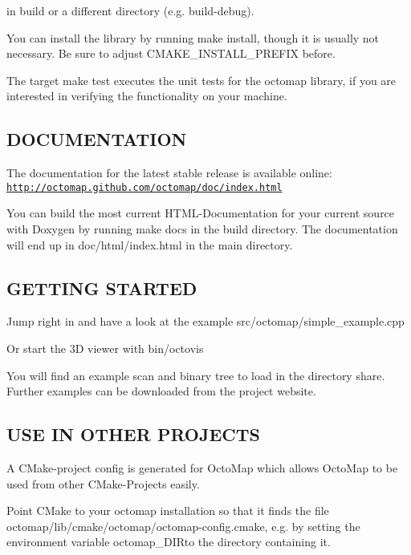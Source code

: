 in {\ttfamily build} or a different directory (e.\+g. {\ttfamily build-\/debug}).

You can install the library by running {\ttfamily make install}, though it is usually not necessary. Be sure to adjust {\ttfamily C\+M\+A\+K\+E\+\_\+\+I\+N\+S\+T\+A\+L\+L\+\_\+\+P\+R\+E\+F\+I\+X} before.

The target {\ttfamily make test} executes the unit tests for the octomap library, if you are interested in verifying the functionality on your machine.

\subsection*{D\+O\+C\+U\+M\+E\+N\+T\+A\+T\+I\+O\+N }

The documentation for the latest stable release is available online\+: \href{http://octomap.github.com/octomap/doc/index.html}{\tt http\+://octomap.\+github.\+com/octomap/doc/index.\+html}

You can build the most current H\+T\+M\+L-\/\+Documentation for your current source with Doxygen by running {\ttfamily make docs} in the build directory. The documentation will end up in {\ttfamily doc/html/index.\+html} in the main directory.

\subsection*{G\+E\+T\+T\+I\+N\+G S\+T\+A\+R\+T\+E\+D }

Jump right in and have a look at the example src/octomap/simple\+\_\+example.\+cpp

Or start the 3\+D viewer with {\ttfamily bin/octovis}

You will find an example scan and binary tree to load in the directory {\ttfamily share}. Further examples can be downloaded from the project website.

\subsection*{U\+S\+E I\+N O\+T\+H\+E\+R P\+R\+O\+J\+E\+C\+T\+S }

A C\+Make-\/project config is generated for Octo\+Map which allows Octo\+Map to be used from other C\+Make-\/\+Projects easily.

Point C\+Make to your octomap installation so that it finds the file octomap/lib/cmake/octomap/octomap-\/config.\+cmake, e.\+g. by setting the environment variable {\ttfamily octomap\+\_\+\+D\+I\+R}to the directory containing it.

